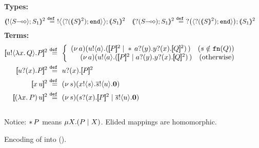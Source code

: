 
\begin{figure}[t]
{\bf Types:}
\begin{align*}
		\tmap{\btout{\lhot{S}}S_1}{2} & \defeq \bbtout{\chtype{\btinp{\tmap{S}{2}}\tinact}}\tmap{S_1}{2}
		&
		\tmap{\btinp{\lhot{S}}S_1}{2} & \defeq \bbtinp{\chtype{\btinp{\tmap{S}{2}}\tinact}}\tmap{S_1}{2}
\end{align*}
{\bf Terms:} 
\begin{align*}
	\pmap{\bout{u}{\abs{x}{Q}} P}{2} & \defeq  
	\left\{
	\begin{array}{r}
		\newsp{a}{\bout{u}{a} (\pmap{P}{2} \Par \repl{} \binp{a}{y} \binp{y}{x} \pmap{Q}{2})\,}\quad
		(s \notin \fn{Q})
		\\
		\newsp{a}{\bout{u}{a} (\pmap{P}{2} \Par \binp{a}{y} \binp{y}{x} \pmap{Q}{2})\,}\quad
		\textrm{(otherwise)} %
	\end{array}
	\right.
	\\
	\pmap{\binp{u}{x} P}{2} &\defeq  \binp{u}{x} \pmap{P}{2}
	 \\
	\pmap{\appl{x}{u}}{2} &\defeq \newsp{s}{\bout{x}{s} \bout{\dual{s}}{u} \inact}
	\\
	\pmap{\appl{(\abs{x}{P})}{u}}{2} & \defeq  %
	\newsp{s}{\binp{s}{x} \pmap{P}{2} \Par \bout{\dual{s}}{u} \inact}
\end{align*}
\\
{Notice: $\ast\,{} P$ means $\mu X. (P \;|\; X)$. Elided mappings are homomorphic.}
\caption{Encoding of \HOp into \sessp (). \label{f:enc:ho_to_sessp}}
\end{figure}

